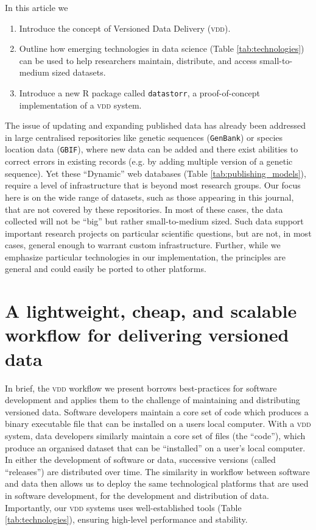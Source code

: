 \documentclass[a4paper,11pt]{article}
\begin{document}
In this article we
\begin{enumerate}
  \item Introduce the concept of Versioned Data Delivery (\textsc{vdd}).
  \item Outline how emerging technologies in data science (Table \ref{tab:technologies}) can be used to help researchers maintain, distribute, and access small-to-medium sized datasets.
  \item Introduce a new \textsc{R} package called \texttt{datastorr}, a proof-of-concept implementation of a \textsc{vdd} system.
\end{enumerate}
The issue of updating and expanding published data has already been addressed in large centralised repositories like genetic sequences (\texttt{GenBank}) or species location data (\texttt{GBIF}), where new data can be added and there exist abilities to correct errors in existing records (e.g. by adding multiple version of a genetic sequence). Yet these ``Dynamic'' web databases (Table \ref{tab:publishing_models}), require a level of infrastructure that is beyond most research groups. Our focus here is on the wide range of datasets, such as those appearing in this journal, that are not covered by these repositories. In most of these cases, the data collected will not be ``big'' but rather small-to-medium sized. Such data support important research projects on particular scientific questions, but are not, in most cases, general enough to warrant custom infrastructure. Further, while we emphasize particular technologies in our implementation, the principles are general and could easily be ported to other platforms.

\section{A lightweight, cheap, and scalable workflow for delivering versioned data}

In brief, the \textsc{vdd} workflow we present borrows best-practices for software development \citep{Perez-Riverol-2016} and applies them to the challenge of maintaining and distributing versioned data. Software developers maintain a core set of code which produces a binary executable file that can be installed on a users local computer. With a \textsc{vdd} system, data developers similarly maintain a core set of files (the ``code''), which produce an organised dataset that can be ``installed'' on a user's local computer. In either the development of software or data, successive versions (called ``releases'') are distributed over time. The similarity in workflow between software and data then allows us to deploy the same technological platforms that are used in software development, for the development and distribution of data. Importantly, our \textsc{vdd} systems uses well-established tools (Table \ref{tab:technologies}), ensuring high-level performance and stability.
\end{document}
